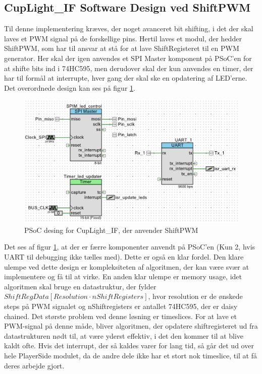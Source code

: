 \documentclass[Softwaredesign/Softwaredesign_main.tex]{subfiles}
\begin{document}
\subsection{CupLight\_IF Software Design ved ShiftPWM}
Til denne implementering kræves, der noget avanceret bit shifting, i det der skal laves et PWM signal på de forskellige pins. Hertil laves et modul, der hedder ShiftPWM, som har til ansvar at stå for at lave ShiftRegisteret til en PWM generator. Her skal der igen anvendes et SPI Master komponent på PSoC'en for at shifte bits ind i 74HC595, men derudover skal der kun anvendes en timer, der har til formål at interrupte, hver gang der skal ske en opdatering af LED'erne. Det overordnede design kan ses på figur \ref{fig:CupLight_ShiftPWM_PSoC_Design}.

\begin{figure}
    \centering
    \includegraphics{Softwaredesign/CupLight_IF/graphics/CupLightPSoCDesign_ShiftPWM.png}
    \caption{PSoC desing for CupLight\_IF, der anvender ShiftPWM}
    \label{fig:CupLight_ShiftPWM_PSoC_Design}
\end{figure}

Det ses af figur \ref{fig:CupLight_ShiftPWM_PSoC_Design}, at der er færre komponenter anvendt på PSoC'en (Kun 2, hvis UART til debugging ikke tælles med). Dette er også en klar fordel. Den klare ulempe ved dette design er kompleksiteten af algoritmen, der kan være svær at implementere og få til at virke. En anden klar ulempe er memory usage, idet algoritmen skal bruge en datastruktur, der fylder $ShiftRegData[Resolution \cdot nShiftRegisters]$, hvor resolution er de ønskede steps på PWM signalet og nShiftregisters er antallet 74HC595, der er daisy chained. Det største problem ved denne løsning er timeslices. For at lave et PWM-signal på denne måde, bliver algoritmen, der opdatere shiftregisteret ud fra datastrukturen nødt til, at være yderst effektiv, i det den kommer til at blive kaldt ofte. Hvis det interrupt, der så kaldes varer for lang tid, så går det ud over hele PlayerSide modulet, da de andre dele ikke har et stort nok timeslice, til at få deres arbejde gjort.
\end{document}
